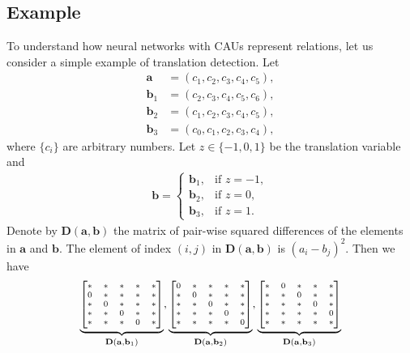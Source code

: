 \documentclass[conference]{IEEEtran}
\begin{document}
\subsection{Example}\label{example}
To understand how neural networks with CAUs represent relations, let us consider a simple example of translation detection.
Let
\begin{align}
\mathbf{a} &= (c_1,c_2,c_3,c_4,c_5),  \\
\mathbf{b}_1 &= (c_2,c_3,c_4,c_5,c_6), \\
\mathbf{b}_2 &= (c_1,c_2,c_3,c_4,c_5), \\
\mathbf{b}_3 &= (c_0,c_1,c_2,c_3,c_4), 
\end{align}
where $\{c_i\}$ are arbitrary numbers. Let $z \in \{-1,0,1\}$ be the translation variable and 
\begin{align}
\mathbf{b} = 
\begin{cases}
\mathbf{b}_1, & \text{if } z=-1, \\
\mathbf{b}_2, & \text{if } z=0, \\
\mathbf{b}_3, & \text{if } z=1. 
\end{cases}
\end{align}
Denote by $\mathbf{D}(\mathbf{a},\mathbf{b})$ the matrix of pair-wise squared differences of the elements in  $\mathbf{a}$ and $\mathbf{b}$. The element of index $(i,j)$ in $\mathbf{D}(\mathbf{a},\mathbf{b})$ is $(a_i-b_j)^2$. Then we have
\begin{align}
\underbrace{
  \scriptsize{
  \begin{bmatrix}
   * & * & * & * & * \\
   0 & * & * & * & * \\
   * & 0 & * & * & * \\
   * & * & 0 & * & * \\        
   * & * & * & 0 & * \\     
  \end{bmatrix}}
}_{\mathbf{D}(\mathbf{a},\mathbf{b}_1)},
\underbrace{
  \scriptsize{
  \begin{bmatrix}
   0 & * & * & * & * \\
   * & 0 & * & * & * \\
   * & * & 0 & * & * \\        
   * & * & * & 0 & * \\    
   * & * & * & * & 0        
  \end{bmatrix}}
}_{\mathbf{D}(\mathbf{a},\mathbf{b}_2)},
\underbrace{
  \scriptsize{
  \begin{bmatrix}  
   * & 0 & * & * & * \\
   * & * & 0 & * & * \\        
   * & * & * & 0 & * \\    
   * & * & * & * & 0 \\
   * & * & * & * & *
  \end{bmatrix}}
}_{\mathbf{D}(\mathbf{a},\mathbf{b}_3)}
\label{A_non_circular}
\end{align}
\end{document}
